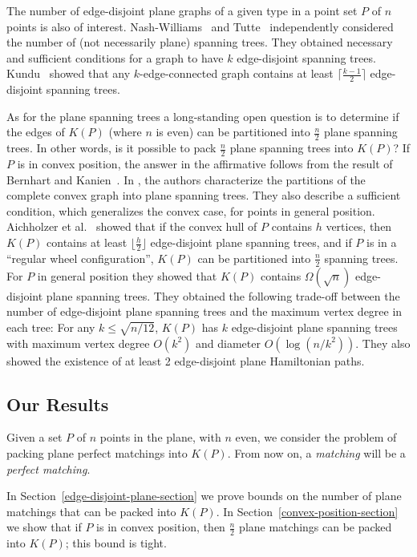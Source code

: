 \documentclass[11pt,a4paper]{article}
\newcommand{\Kn}[1]{K#1}
\begin{document}
The number of edge-disjoint plane graphs of a given type in a point set $P$ of $n$ points is also of interest. Nash-Williams~\cite{Nash-Williams1961} and Tutte~\cite{Tutte1961} independently considered the number of (not necessarily plane) spanning trees. They obtained necessary and sufficient conditions for a graph to have $k$ edge-disjoint spanning trees. Kundu~\cite{Kundu1974} showed that any $k$-edge-connected graph contains at least $\lceil\frac{k-1}{2}\rceil$ edge-disjoint spanning trees. 

As for the plane spanning trees a long-standing open question is to determine if the edges of $\Kn{(P)}$ (where $n$ is even) can be partitioned into $\frac{n}{2}$ plane spanning trees. In other words, is it possible to pack $\frac{n}{2}$ plane spanning trees into $\Kn{(P)}$? If $P$ is in convex position, the answer in the affirmative follows from the result of Bernhart and Kanien~\cite{Bernhart1979}. In \cite{Bose2006}, the authors characterize the partitions of the complete convex graph into plane spanning trees. They also describe a sufficient condition, which generalizes the convex case, for points in general position. Aichholzer et al.~\cite{Aichholzer2014} showed that if the convex hull of $P$ contains $h$ vertices, then $\Kn{(P)}$ contains at least $\lfloor\frac{h}{2}\rfloor$ edge-disjoint plane spanning trees, and if $P$ is in a ``regular wheel configuration'', $\Kn{(P)}$ can be partitioned into $\frac{n}{2}$ spanning trees. For $P$ in general position they showed that $\Kn{(P)}$ contains $\Omega(\sqrt{n})$ edge-disjoint plane spanning trees. They obtained the following trade-off between the number of edge-disjoint plane spanning trees and the maximum vertex degree in each tree: For any $k\le \sqrt{n/12}$, $\Kn{(P)}$ has $k$ edge-disjoint plane spanning trees with maximum vertex degree $O(k^2)$ and diameter $O(\log(n/k^2))$. They also showed the existence of at least 2 edge-disjoint plane Hamiltonian paths. 

\subsection{Our Results}
\label{our-results-section}

Given a set $P$ of $n$ points in the plane, with $n$ even, we consider the problem of packing plane perfect matchings into $\Kn{(P)}$. 
From now on, a {\em matching} will be a {\em perfect matching}. 

In Section~\ref{edge-disjoint-plane-section} we prove bounds on the number of plane matchings that can be packed into $\Kn{(P)}$. 
In Section~\ref{convex-position-section} we show that if $P$ is in convex position, then $\frac{n}{2}$ plane matchings can be packed into $\Kn{(P)}$; this bound is tight. 
\end{document}
